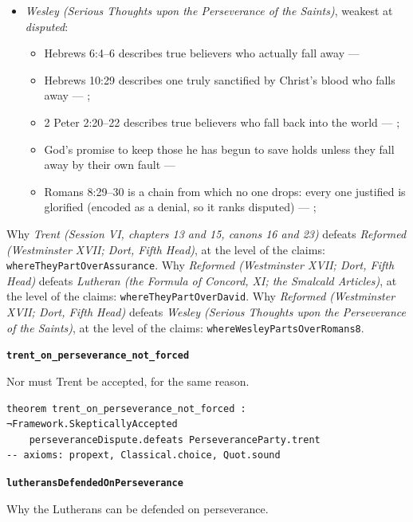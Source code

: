 \documentclass[11pt]{article}
\begin{document}
\begin{itemize}
\begin{itemize}
\end{itemize}
\item \emph{Wesley (Serious Thoughts upon the Perseverance of the Saints)}, weakest at \emph{disputed}:
\begin{itemize}
\item Hebrews 6:4–6 describes true believers who actually fall away --- \cite[449]{wesley-works-9-1827}
\item Hebrews 10:29 describes one truly sanctified by Christ’s blood who falls away --- \cite[448--449]{wesley-works-9-1827}; \cite[585]{wesley-explanatory-notes-nt}
\item 2 Peter 2:20–22 describes true believers who fall back into the world --- \cite[445--446]{wesley-works-9-1827}; \cite[625]{wesley-explanatory-notes-nt}
\item God’s promise to keep those he has begun to save holds unless they fall away by their own fault --- \cite[444--445]{wesley-works-9-1827}
\item Romans 8:29–30 is a chain from which no one drops: every one justified is glorified (encoded as a denial, so it ranks disputed) --- \cite[384]{wesley-explanatory-notes-nt}; \cite[413]{wesley-works-9-1827}
\end{itemize}
\end{itemize}
\noindent Why \emph{Trent (Session VI, chapters 13 and 15, canons 16 and 23)} defeats \emph{Reformed (Westminster XVII; Dort, Fifth Head)}, at the level of the claims: \texttt{where\allowbreak{}They\allowbreak{}Part\allowbreak{}Over\allowbreak{}Assurance}.
\noindent Why \emph{Reformed (Westminster XVII; Dort, Fifth Head)} defeats \emph{Lutheran (the Formula of Concord, XI; the Smalcald Articles)}, at the level of the claims: \texttt{where\allowbreak{}They\allowbreak{}Part\allowbreak{}Over\allowbreak{}David}.
\noindent Why \emph{Reformed (Westminster XVII; Dort, Fifth Head)} defeats \emph{Wesley (Serious Thoughts upon the Perseverance of the Saints)}, at the level of the claims: \texttt{where\allowbreak{}Wesley\allowbreak{}Parts\allowbreak{}Over\allowbreak{}Romans8}.
\par\medskip\noindent\textbf{\texttt{trent\_\allowbreak{}on\_\allowbreak{}perseverance\_\allowbreak{}not\_\allowbreak{}forced}}\par\nobreak\noindent
Nor must Trent be accepted, for the same reason.

{\small\begin{verbatim}
theorem trent_on_perseverance_not_forced : ¬Framework.SkepticallyAccepted
    perseveranceDispute.defeats PerseveranceParty.trent
-- axioms: propext, Classical.choice, Quot.sound
\end{verbatim}}
\par\medskip\noindent\textbf{\texttt{lutherans\allowbreak{}Defended\allowbreak{}On\allowbreak{}Perseverance}}\par\nobreak\noindent
Why the Lutherans can be defended on perseverance.
\end{document}
